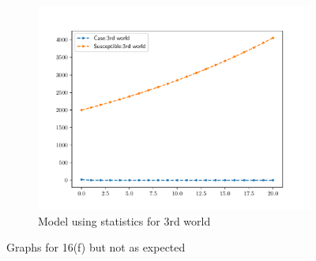 \begin{homeworkProblem}
\begin{figure}[htbp]
\begin{subfigure}{0.4\linewidth}
    \includegraphics[scale=0.6]{fig/fig16(f)(2).pdf}
    \caption{Model using statistics for 3rd world}
    \end{subfigure}
    \caption{Graphs for 16(f) but not as expected}
\end{figure}
\end{homeworkProblem}